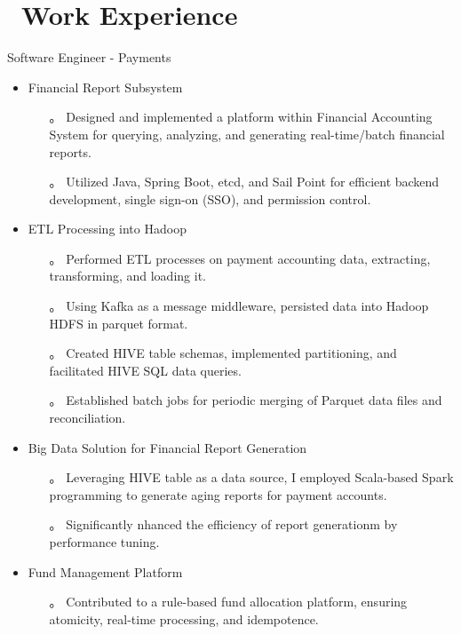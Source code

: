 \documentclass{resume}
\begin{document}
\section{\faUsers\ Work Experience}
Software Engineer - Payments
\begin{itemize}
  \item Financial Report Subsystem
  \begin{itemize}
    \item[。] Designed and implemented a platform within Financial Accounting System for querying, analyzing, and generating real-time/batch financial reports.
    \item[。] Utilized Java, Spring Boot, etcd, and Sail Point for efficient backend development, single sign-on (SSO), and permission control.
  \end{itemize}

  \item ETL Processing into Hadoop
  \begin{itemize}
    \item[。] Performed ETL processes on payment accounting data, extracting, transforming, and loading it.
    \item[。] Using Kafka as a message middleware, persisted data into Hadoop HDFS in parquet format.
    \item[。] Created HIVE table schemas, implemented partitioning, and facilitated HIVE SQL data queries.
    \item[。] Established batch jobs for periodic merging of Parquet data files and reconciliation.
  \end{itemize}

  \item Big Data Solution for Financial Report Generation
  \begin{itemize}
    \item[。] Leveraging HIVE table as a data source, I employed Scala-based Spark programming to generate aging reports for payment accounts.
    \item[。] Significantly nhanced the efficiency of report generationm by performance tuning.
  \end{itemize}

  \item Fund Management Platform
  \begin{itemize}
    \item[。] Contributed to a rule-based fund allocation platform, ensuring atomicity, real-time processing, and idempotence.
  \end{itemize}


\end{itemize}
\end{document}
